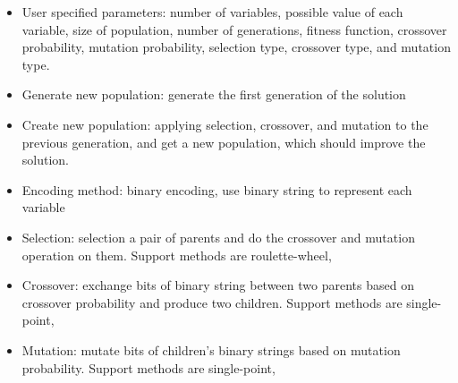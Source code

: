 \documentclass[landscape,a0paper,fontscale=0.285]{baposter} %
\newcommand{\compresslist}{ %
	\setlength{\itemsep}{1pt}
	\setlength{\parskip}{0pt}
	\setlength{\parsep}{0pt}
	}
\begin{document}
\begin{poster}
{\begin{multicols}{2}
{
	}

	\vspace{3em}

	\begin{itemize}\compresslist
	\item User specified parameters: number of variables, possible value of each variable, size of population, number of generations, fitness function, crossover probability, mutation probability, selection type, crossover type, and mutation type.
	\item Generate new population: generate the first generation of the solution
	\item Create new population: applying selection, crossover, and mutation to the previous generation, and get a new population, which should improve the solution.
	\item Encoding method: binary encoding, use binary string to represent each variable
	\item Selection: selection a pair of parents and do the crossover and mutation operation on them. Support methods are roulette-wheel, 
	\item Crossover: exchange bits of binary string between two parents based on crossover probability and produce two children. Support methods are single-point,
	\item Mutation: mutate bits of children's binary strings based on mutation probability. Support methods are single-point,
	\end{itemize}

	\end{multicols}
	}



\end{poster}
\end{document}
